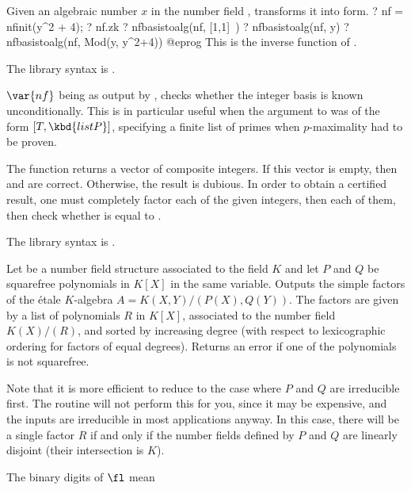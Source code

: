 \label{se:nfbasistoalg}
Given an algebraic number $x$ in the number field , transforms it
into  form.
\bprog
? nf = nfinit(y^2 + 4);
? nf.zk
? nfbasistoalg(nf, [1,1]~)
? nfbasistoalg(nf, y)
? nfbasistoalg(nf, Mod(y, y^2+4))
@eprog
This is the inverse function of .

The library syntax is .

\label{se:nfcertify}
$\var{nf}$ being as output by
, checks whether the integer basis is known unconditionally.
This is in particular useful when the argument to  was of the
form $[T, \kbd{listP}]$, specifying a finite list of primes when
$p$-maximality had to be proven.

The function returns a vector of composite integers. If this vector is
empty, then  and  are correct. Otherwise, the
result is dubious. In order to obtain a certified result, one must
completely factor each of the given integers, then  each of
them, then check whether  is equal to .

The library syntax is .

\label{se:nfcompositum}
Let  be a number field structure associated to the field $K$
and let  $P$ and $Q$
be squarefree polynomials in $K[X]$ in the same variable. Outputs
the simple factors of the \'etale $K$-algebra $A = K(X, Y) / (P(X), Q(Y))$.
The factors are given by a list of polynomials $R$ in $K[X]$, associated to
the number field $K(X)/ (R)$, and sorted by increasing degree (with respect
to lexicographic ordering for factors of equal degrees). Returns an error if
one of the polynomials is not squarefree.

Note that it is more efficient to reduce to the case where $P$ and $Q$ are
irreducible first. The routine will not perform this for you, since it may be
expensive, and the inputs are irreducible in most applications anyway. In
this case, there will be a single factor $R$ if and only if the number
fields defined by $P$ and $Q$ are linearly disjoint (their intersection is
$K$).

The binary digits of $\fl$ mean

